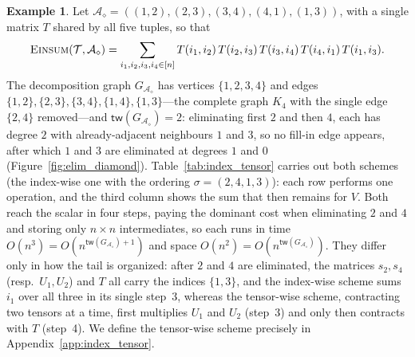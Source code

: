 \documentclass[sn-mathphys, natbib=false]{sn-jnl}
\theoremstyle{plain}
\theoremstyle{definition}
\newtheorem{example}{Example}
\newcommand{\tensorcontraction}{\textsc{Einsum}}
\newcommand{\treewidthp}[1]{\mathsf{tw}(#1)}
\newcommand{\completegraphp}[1]{K_{#1}}
\newcommand{\less}{O}
\newif\ifshowchanges
\newcommand{\rev}[1]{%
  \ifshowchanges
    {\color{red} #1}%
  \else
    #1%
  \fi
}
\def\calA{\mathcal{A}}
\def\calT{\mathcal{T}}
\begin{document}
\begin{bibunit}[agsm]
\rev{%
\begin{example}\label{eg:index_tensor}
Let $\calA_\diamond = ((1,2),(2,3),(3,4),(4,1),(1,3))$, with a single matrix $T$ shared by all five tuples, so that
\begin{align*}
\tensorcontraction(\calT, \calA_\diamond) = \sum_{i_1, i_2, i_3, i_4 \in [n]} T(i_1, i_2)\, T(i_2, i_3)\, T(i_3, i_4)\, T(i_4, i_1)\, T(i_1, i_3).
\end{align*}
The decomposition graph $G_{\calA_\diamond}$ has vertices $\{1,2,3,4\}$ and edges $\{1,2\}, \{2,3\}, \{3,4\}, \{1,4\}, \{1,3\}$---the complete graph $\completegraphp{4}$ with the single edge $\{2,4\}$ removed---and $\treewidthp{G_{\calA_\diamond}} = 2$: eliminating first $2$ and then $4$, each has degree $2$ with already-adjacent neighbours $1$ and $3$, so no fill-in edge appears, after which $1$ and $3$ are eliminated at degrees $1$ and $0$ (Figure~\ref{fig:elim_diamond}). Table~\ref{tab:index_tensor} carries out both schemes (the index-wise one with the ordering $\sigma = (2,4,1,3)$): each row performs one operation, and the third column shows the sum that then remains for $V$. Both reach the scalar in four steps, paying the dominant cost when eliminating $2$ and $4$ and storing only $n \times n$ intermediates, so each runs in time $\less(n^3) = \less(n^{\treewidthp{G_{\calA_\diamond}}+1})$ and space $\less(n^2) = \less(n^{\treewidthp{G_{\calA_\diamond}}})$. They differ only in how the tail is organized: after $2$ and $4$ are eliminated, the matrices $s_2, s_4$ (resp.\ $U_1, U_2$) and $T$ all carry the indices $\{1,3\}$, and the index-wise scheme sums $i_1$ over all three in its single step~3, whereas the tensor-wise scheme, contracting two tensors at a time, first multiplies $U_1$ and $U_2$ (step~3) and only then contracts with $T$ (step~4). We define the tensor-wise scheme precisely in Appendix~\ref{app:index_tensor}.
\end{example}%
}


\end{bibunit}
\end{document}
